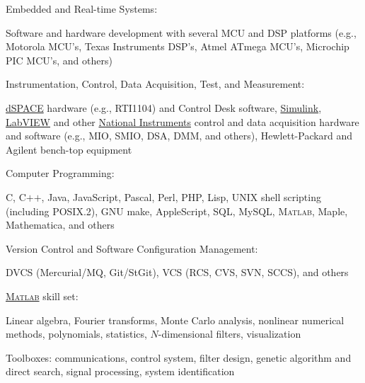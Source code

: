 \documentclass[10pt]{article}
\newenvironment{innerlist}[1][\enskip\textbullet]%
        {\begin{compactitem}[#1]}{\end{compactitem}}
\newcommand{\halfblankline}{\quad\vspace{-0.5\baselineskip}\pagebreak[3]}
\providecommand\Matlab{\textsc{Matlab}}
\begin{document}
\halfblankline

Embedded and Real-time Systems:
%
\begin{innerlist}
    \item Software and hardware development with several MCU and
        DSP platforms (e.g., Motorola MCU's, Texas Instruments DSP's, Atmel
        ATmega MCU's, Microchip PIC MCU's, and others)
\end{innerlist}

\halfblankline

Instrumentation, Control, Data Acquisition, Test, and Measurement:
%
\begin{innerlist}
    \item \href{http://www.dspaceinc.com/}{dSPACE} hardware (e.g.,
        RTI1104) and Control Desk software,
        \href{http://www.mathworks.com/products/simulink/}{Simulink},
        \href{http://www.ni.com/}{LabVIEW} and other
        \href{http://www.ni.com}{National Instruments}
        control and data acquisition hardware and software (e.g., MIO,
        SMIO, DSA, DMM, and others), Hewlett-Packard and Agilent
        bench-top equipment
\end{innerlist}

\halfblankline

Computer Programming:
%
\begin{innerlist}
    \item C, C$+$$+$, Java, JavaScript, Pascal, Perl, PHP, Lisp, UNIX
        shell scripting (including POSIX.2), GNU make, AppleScript, SQL,
        MySQL, \Matlab, Maple, Mathematica, and others
\end{innerlist}

\halfblankline

Version Control and Software Configuration Management:
%
\begin{innerlist}
    \item DVCS (Mercurial/MQ, Git/StGit), VCS (RCS, CVS, SVN, SCCS), and
        others
\end{innerlist}

\halfblankline

\href{http://www.mathworks.com/products/matlab/}{\Matlab} skill set:
%
\begin{innerlist}
    \item Linear algebra, Fourier transforms, Monte Carlo analysis,
        nonlinear numerical methods, polynomials, statistics,
        $N$-dimensional filters, visualization

    \item Toolboxes: communications, control system, filter design,
        genetic algorithm and direct search, signal processing, system
        identification
\end{innerlist}
\end{document}
